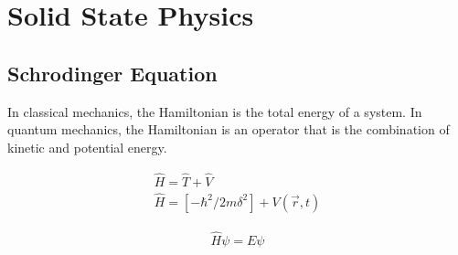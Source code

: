 \section{Solid State Physics}


\subsection{Schrodinger Equation}

In classical mechanics, the Hamiltonian is the total energy of a system.  In quantum mechanics, the Hamiltonian is an operator that is the combination of kinetic and potential energy.


\begin{equation}
  \begin{split}
  \hat{H} = \hat{T} + \hat{V} \\
  \hat{H} = \left[ -{\hbar^2} / {2 m} {\delta}^2 \right] + V(\vec{r}, t)
  \end{split}
  \label{eq:eqTimeIndependentSchrodinger}
\end{equation}


\begin{equation}
  \begin{split}
  \hat{H} \psi = E \psi
  \end{split}
  \label{eq:eqTimeIndependentSchrodinger}
\end{equation}













